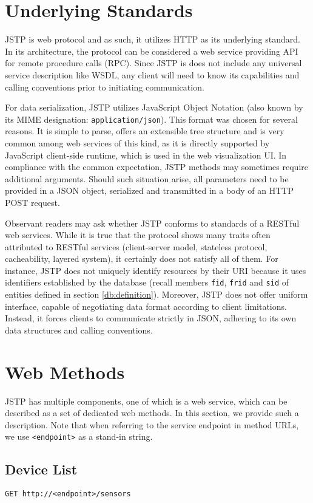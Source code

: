 \section{Underlying Standards}
JSTP is web protocol and as such, it utilizes HTTP as its underlying standard. In its architecture, the protocol can be considered a web service providing API for remote procedure calls (RPC). Since JSTP is does not include any universal service description like WSDL, any client will need to know its capabilities and calling conventions prior to initiating communication.

For data serialization, JSTP utilizes JavaScript Object Notation (also known by its MIME designation: \texttt{application/json}). This format was chosen for several reasons. It is simple to parse, offers an extensible tree structure and is very common among web services of this kind, as it is directly supported by JavaScript client-side runtime, which is used in the web visualization UI. In compliance with the common expectation, JSTP methods may sometimes require additional arguments. Should such situation arise, all parameters need to be provided in a JSON object, serialized and transmitted in a body of an HTTP POST request.

Observant readers may ask whether JSTP conforms to standards of a RESTful web services. While it is true that the protocol shows many traits often attributed to RESTful services (client-server model, stateless protocol, cacheability, layered system), it certainly does not satisfy all of them. For instance, JSTP does not uniquely identify resources by their URI because it uses identifiers established by the database (recall members \texttt{fid}, \texttt{frid} and \texttt{sid} of entities defined in section \ref{db:definition}). Moreover, JSTP does not offer uniform interface, capable of negotiating data format according to client limitations. Instead, it forces clients to communicate strictly in JSON, adhering to its own data structures and calling conventions.

\section{Web Methods}
JSTP has multiple components, one of which is a web service, which can be described as a set of dedicated web methods. In this section, we provide such a description. Note that when referring to the service endpoint in method URLs, we use \texttt{<endpoint>} as a stand-in string.

\subsection{Device List}
\hfill\texttt{GET http://<endpoint>/sensors}

